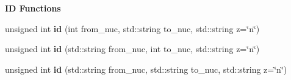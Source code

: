 \begin{Indent}{\bf ID Functions}
\begin{DoxyCompactItemize}
\item 
unsigned int {\bfseries id} (int from\+\_\+nuc, std\+::string to\+\_\+nuc, std\+::string z=\char`\"{}n\char`\"{})\hypertarget{namespacepyne_1_1rxname_a59db818b92ee0c58e5da5e29ecccb7b3}{}\label{namespacepyne_1_1rxname_a59db818b92ee0c58e5da5e29ecccb7b3}

\item 
unsigned int {\bfseries id} (std\+::string from\+\_\+nuc, int to\+\_\+nuc, std\+::string z=\char`\"{}n\char`\"{})\hypertarget{namespacepyne_1_1rxname_aeef408cf1b26de2f7828c35981db3f88}{}\label{namespacepyne_1_1rxname_aeef408cf1b26de2f7828c35981db3f88}

\item 
unsigned int {\bfseries id} (std\+::string from\+\_\+nuc, std\+::string to\+\_\+nuc, std\+::string z=\char`\"{}n\char`\"{})\hypertarget{namespacepyne_1_1rxname_a8b635b6cfe404af21b0a0c7744d911aa}{}\label{namespacepyne_1_1rxname_a8b635b6cfe404af21b0a0c7744d911aa}

\end{DoxyCompactItemize}
\end{Indent}
